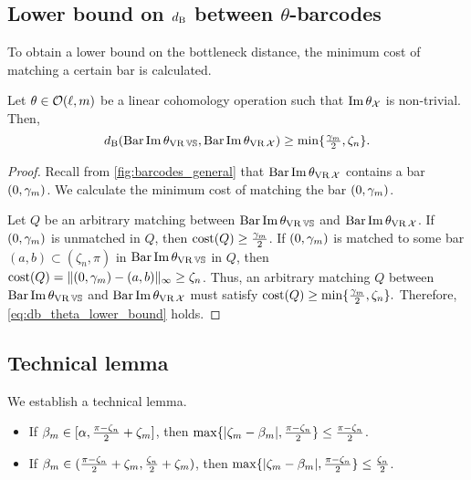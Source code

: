 
\subsection{Lower bound on $d_{\mathrm{B}}$ between $\theta$-barcodes}
\label{subsub:db_theta_lower_bound}

To obtain a lower bound on the bottleneck distance, the minimum cost of matching a certain bar is calculated.

\medskip\proposition
Let $\theta \in \mathcal{O}(\ell, m)$ be a linear cohomology operation such that $\operatorname{Im} \theta_{\mathcal{X}}$ is non-trivial.
Then,
\begin{equation}\label{eq:db_theta_lower_bound}
	\db(\thetabarc{\VS}, \thetabarc{\cX})
	\geq \min\{\tfrac{\gamma_\degp }{2}, \zeta_n\}. %
\end{equation}

\begin{proof}
	Recall from \cref{fig:barcodes_general} that $\operatorname{Bar}\operatorname{Im} \theta_{\operatorname{VR} \mathcal{X}}$ contains a bar $(0,\gamma_m)$.
	We calculate the minimum cost of matching the bar $(0,\gamma_m)$.

	Let $Q$ be an arbitrary matching between $\operatorname{Bar}\operatorname{Im} \theta_{\operatorname{VR} \mathbb{V}\mathbb{S}}$ and $\operatorname{Bar}\operatorname{Im} \theta_{\operatorname{VR} \mathcal{X}}$.
	If $(0,\gamma_m )$ is unmatched in $Q$, then $\mathrm{cost}(Q) \geq \tfrac{\gamma_m }{2}$.
	If $(0,\gamma_m )$ is matched to some bar $(a,b) \subset (\zeta_n, \pi)$ in $\operatorname{Bar}\operatorname{Im} \theta_{\operatorname{VR} \mathbb{V}\mathbb{S}}$ in $Q$, then
	$\mathrm{cost}(Q) =  \|(0,\gamma_m ) - (a,b)\|_\infty \geq \zeta_n$.
	Thus, an arbitrary matching $Q$ between $\operatorname{Bar}\operatorname{Im} \theta_{\operatorname{VR} \mathbb{V}\mathbb{S}}$ and $\operatorname{Bar}\operatorname{Im} \theta_{\operatorname{VR} \mathcal{X}}$ must satisfy $\mathrm{cost}(Q) \geq \min\{\tfrac{\gamma_m }{2}, \zeta_n\}.$
	Therefore, \cref{eq:db_theta_lower_bound} holds.
\end{proof}

\subsection{Technical lemma}
\label{subsub:comparison_lemma}

We establish a technical lemma.

\medskip\lemma
\begin{itemize}
	\item If $\beta_m \in [\alpha, \tfrac{\pi - \zeta_n}{2}+\zeta_m]$, then
	$\max\{|\zeta_m  - \beta_m |, \tfrac{\pi - \zeta_n}{2}\}
	\leq \tfrac{\pi - \zeta_n}{2}$.
	\item If $\beta_m \in (\tfrac{\pi - \zeta_n}{2}+\zeta_m, \tfrac{\zeta_n}{2}+\zeta_m)$, then
	$\max\{|\zeta_m  - \beta_m |, \tfrac{\pi - \zeta_n}{2}\}
	\leq \tfrac{\zeta_n}{2}$.
\end{itemize}

